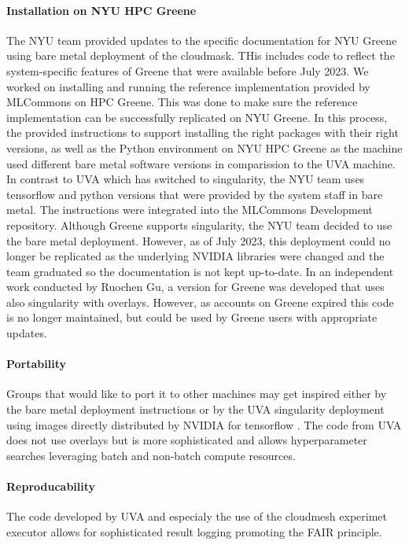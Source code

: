 \documentclass[sigplan,screen]{acmart}
\begin{document}
\paragraph{Installation on NYU HPC Greene} The NYU team provided updates to the specific documentation for NYU Greene using bare metal deployment of the cloudmask. THis includes code to reflect the system-specific features of Greene that were available before July 2023. We worked on installing and running the reference implementation provided by MLCommons on HPC Greene. This was done to make sure the reference implementation can be successfully replicated on NYU Greene. In this process, the provided instructions to support installing the right packages with their right versions, as well as the Python environment on NYU HPC Greene as the machine used different bare metal software versions in comparission to the UVA machine.  In contrast to UVA which has switched to singularity, the NYU team uses tensorflow and python versions that were provided by the system staff in bare metal. The instructions were integrated into the MLCommons Development repository. Although Greene supports singularity, the NYU team decided to use the bare metal deployment. However, as of July 2023, this deployment could no longer be replicated as the underlying NVIDIA libraries were changed and the team graduated so the documentation is not kept up-to-date. 
In an independent work conducted by Ruochen Gu, a version for Greene was developed that uses also singularity with overlays. However, as accounts on Greene expired this code is no longer maintained, but could be used by Greene users with appropriate updates.

\paragraph{Portability} Groups that would like to port it to other machines may get inspired either by the bare metal deployment instructions or by the UVA singularity deployment using images directly distributed by NVIDIA for tensorflow \cite{las-2023-escience-cloudmask}. The code from UVA does not use overlays but is more sophisticated and allows hyperparameter searches leveraging batch and non-batch compute resources.

\paragraph{Reproducability} The code developed by UVA and especialy the use of the cloudmesh experimet executor \cite{github-cloudmesh-ee,las-2023-escience-cloudmask} allows for sophisticated result logging promoting the FAIR principle.
\end{document}
